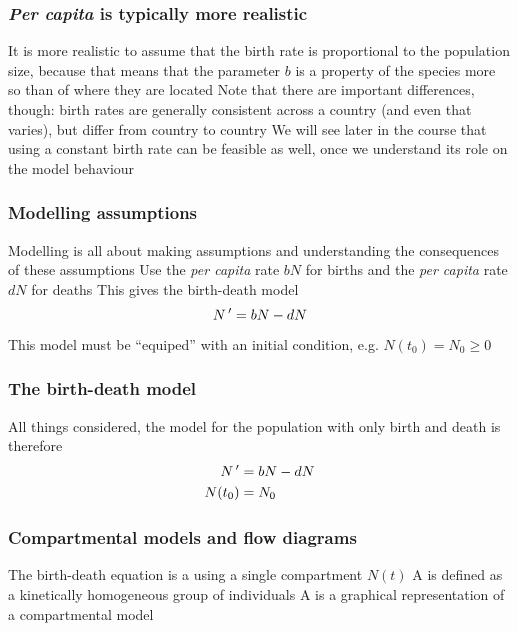 \documentclass[aspectratio=169]{beamer}
\begin{document}
\begin{frame}\frametitle{\emph{Per capita} is typically more realistic}
It is more realistic to assume that the birth rate is proportional to the population size, because that means that the parameter $b$ is a property of the species more so than of where they are located
\vfill
Note that there are important differences, though: birth rates are generally consistent across a country (and even that varies), but differ from country to country
\vfill
We will see later in the course that using a constant birth rate can be feasible as well, once we understand its role on the model behaviour
\end{frame}

\begin{frame}\frametitle{Modelling assumptions}
Modelling is all about making assumptions and understanding the consequences of these assumptions
\vfill
Use the \emph{per capita} rate $bN$ for births and the \emph{per capita} rate $dN$ for deaths
\vfill
This gives the birth-death model
\[
N\,'=bN-dN
\]
This model must be ``equiped'' with an initial condition, e.g. $N(t_0)=N_0\geq 0$
\end{frame}

\begin{frame}\frametitle{The birth-death model}
All things considered, the model for the population with only birth and death is therefore
\begin{subequations}
\label{sys:birth-death-ODE}
\begin{align}
N\,' &= bN-dN \label{sys:birth-death-ODE-dN} \\
N(t_0) &= N_0 \label{sys:birth-death-ODE-IC}
\end{align}
\end{subequations}
\end{frame}


\begin{frame}\frametitle{Compartmental models and flow diagrams}
The birth-death equation is a  using a single compartment $N(t)$
\vfill
A  is defined as a kinetically homogeneous group of individuals
\vfill
A  is a graphical representation of a compartmental model
\begin{center}
\end{center}
\end{frame}
\end{document}
